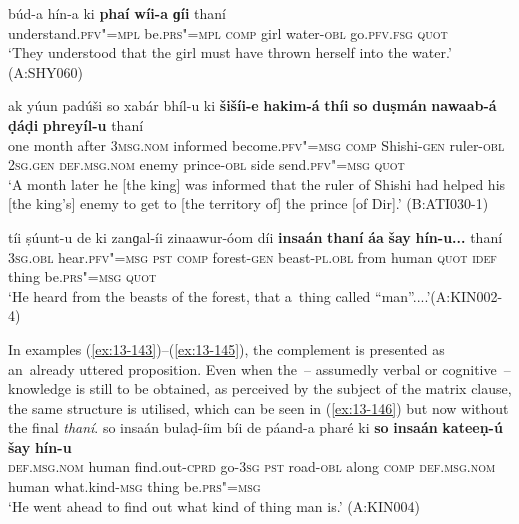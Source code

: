 \begin{exe}
\ex
\label{ex:13-143}
\gll \label{bkm:Ref190835538}búd-a hín-a ki \textbf{phaí} \textbf{wíi-a} \textbf{ ɡíi} thaní \\
understand.\textsc{pfv"=mpl} be.\textsc{prs"=mpl} \textsc{comp} girl water-\textsc{obl} go.\textsc{pfv.fsg} \textsc{quot} \\
\glt `They understood that the girl must have thrown herself into the water.' (A:SHY060)

\ex
\label{ex:13-144}
\gll ak yúun padúši so xabár bhíl-u  ki \textbf{šišíi-e} \textbf{hakim-á} \textbf{thíi} \textbf{so} \textbf{duṣmán} \textbf{nawaab-á} \textbf{ḍáḍi} \textbf{phreyíl-u} thaní \\
one month after \textsc{3msg.nom} informed become.\textsc{pfv"=msg}  \textsc{comp} Shishi-\textsc{gen} ruler-\textsc{obl } \textsc{2sg.gen} \textsc{def.msg.nom} enemy prince-\textsc{obl} side send.\textsc{pfv"=msg} \textsc{quot}  \\
\glt `A month later he [the king] was informed that the ruler of Shishi had helped his [the king's] enemy to get to [the territory of] the prince [of Dir].' (B:ATI030-1)

\ex
\label{ex:13-145}
\gll \label{bkm:Ref190835565}tíi ṣúunt-u de ki zanɡal-íi zinaawur-óom  díi \textbf{insaán} \textbf{thaní} \textbf{áa} \textbf{šay} \textbf{hín-u\textbf{...}} thaní \\
\textsc{3sg.obl} hear.\textsc{pfv"=msg} \textsc{pst} \textsc{comp} forest-\textsc{gen} beast-\textsc{pl.obl}  from human \textsc{quot} \textsc{idef} thing be.\textsc{prs"=msg} \textsc{quot} \\
\glt `He heard from the beasts of the forest, that a~thing called ``man''....'\newline (A:KIN002-4) 
\end{exe}

In examples (\ref{ex:13-143})--(\ref{ex:13-145}), the complement is presented as an~already uttered proposition. Even when the~-- assumedly verbal or cognitive~-- knowledge is still to be obtained, as perceived by the subject of the matrix clause, the same structure is utilised, which can be seen in (\ref{ex:13-146}) but now without the final \textit{thaní}. 
\ea
\label{ex:13-146}
\gll so insaán bulaḍ-íim bíi de páand-a pharé ki \textbf{so} \textbf{insaán} \textbf{kateeṇ-ú} \textbf{šay} \textbf{hín-u}\\
\textsc{def.msg.nom} human find.out-\textsc{cprd} go-\textsc{3sg} \textsc{pst} road-\textsc{obl}  along \textsc{comp} \textsc{def.msg.nom} human what.kind-\textsc{msg} thing be.\textsc{prs"=msg}\\
\glt `He went ahead to find out what kind of thing man is.' (A:KIN004) 
\z

